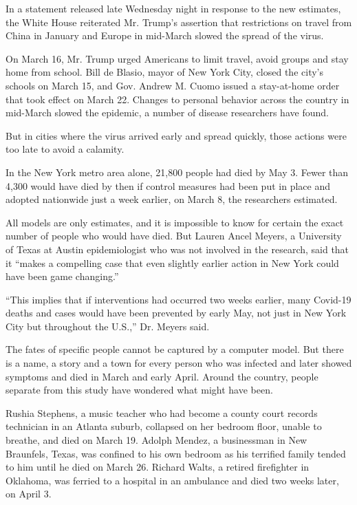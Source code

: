 In a statement released late Wednesday night in response to the new
estimates, the White House reiterated Mr. Trump's assertion that
restrictions on travel from China in January and Europe in mid-March
slowed the spread of the virus.

On March 16, Mr. Trump urged Americans to limit travel, avoid groups and
stay home from school. Bill de Blasio, mayor of New York City, closed
the city's schools on March 15, and Gov. Andrew M. Cuomo issued a
stay-at-home order that took effect on March 22. Changes to personal
behavior across the country in mid-March slowed the epidemic, a number
of disease researchers have found.

But in cities where the virus arrived early and spread quickly, those
actions were too late to avoid a calamity.

In the New York metro area alone, 21,800 people had died by May 3. Fewer
than 4,300 would have died by then if control measures had been put in
place and adopted nationwide just a week earlier, on March 8, the
researchers estimated.

All models are only estimates, and it is impossible to know for certain
the exact number of people who would have died. But Lauren Ancel Meyers,
a University of Texas at Austin epidemiologist who was not involved in
the research, said that it ``makes a compelling case that even slightly
earlier action in New York could have been game changing.''

``This implies that if interventions had occurred two weeks earlier,
many Covid-19 deaths and cases would have been prevented by early May,
not just in New York City but throughout the U.S.,'' Dr. Meyers said.

The fates of specific people cannot be captured by a computer model. But
there is a name, a story and a town for every person who was infected
and later showed symptoms and died in March and early April. Around the
country, people separate from this study have wondered what might have
been.

Rushia Stephens, a music teacher who had become a county court records
technician in an Atlanta suburb, collapsed on her bedroom floor, unable
to breathe, and died on March 19. Adolph Mendez, a businessman in New
Braunfels, Texas, was confined to his own bedroom as his terrified
family tended to him until he died on March 26. Richard Walts, a retired
firefighter in Oklahoma, was ferried to a hospital in an ambulance and
died two weeks later, on April 3.

